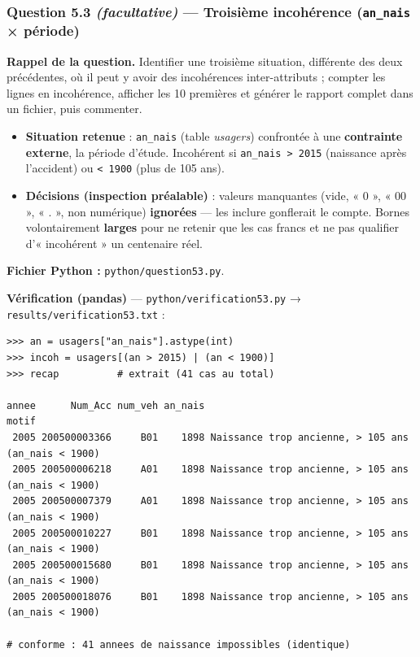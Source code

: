 \documentclass[11pt,a4paper]{article}
\newcommand{\rub}[2]{\textbf{\textcolor{#1}{#2}}}
\begin{document}
\clearpage
\subsubsection*{Question 5.3 \emph{(facultative)} — Troisième incohérence (\texttt{an\_nais} × période)}

\rub{labrappel}{Rappel de la question.} Identifier une troisième situation, différente des deux précédentes, où il peut y avoir des incohérences inter-attributs ; compter les lignes en incohérence, afficher les 10 premières et générer le rapport complet dans un fichier, puis commenter.

\begin{agentbox}
\begin{itemize}
\item \textbf{Situation retenue} : \texttt{an\_nais} (table \emph{usagers}) confrontée à une \textbf{contrainte externe}, la période d'étude. Incohérent si \texttt{an\_nais > 2015} (naissance après l'accident) ou \texttt{< 1900} (plus de 105 ans).
\item \textbf{Décisions (inspection préalable)} : valeurs manquantes (vide, « 0 », « 00 », « . », non numérique) \textbf{ignorées} — les inclure gonflerait le compte. Bornes volontairement \textbf{larges} pour ne retenir que les cas francs et ne pas qualifier d'« incohérent » un centenaire réel.
\end{itemize}
\end{agentbox}

\rub{labfichier}{Fichier Python :} \texttt{python/question53.py}.

\rub{labverif}{Vérification (pandas)} --- \texttt{python/verification53.py} → \texttt{results/verification53.txt} :

\begin{lstlisting}[style=pyblock]
>>> an = usagers["an_nais"].astype(int)
>>> incoh = usagers[(an > 2015) | (an < 1900)]
>>> recap          # extrait (41 cas au total)

annee      Num_Acc num_veh an_nais                                               motif
 2005 200500003366     B01    1898 Naissance trop ancienne, > 105 ans (an_nais < 1900)
 2005 200500006218     A01    1898 Naissance trop ancienne, > 105 ans (an_nais < 1900)
 2005 200500007379     A01    1898 Naissance trop ancienne, > 105 ans (an_nais < 1900)
 2005 200500010227     B01    1898 Naissance trop ancienne, > 105 ans (an_nais < 1900)
 2005 200500015680     B01    1898 Naissance trop ancienne, > 105 ans (an_nais < 1900)
 2005 200500018076     B01    1898 Naissance trop ancienne, > 105 ans (an_nais < 1900)

# conforme : 41 annees de naissance impossibles (identique)
\end{lstlisting}
\end{document}
